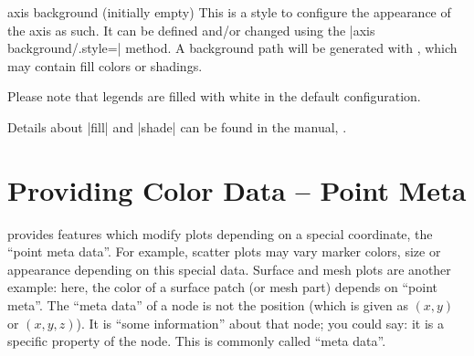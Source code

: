 \begin{pgfplotskey}{axis background (initially empty)}
    This is a style to configure the appearance of the axis as such. It can be
    defined and/or changed using the |axis background/.style=|
    method. A background path will be generated with , which may
    contain fill colors or shadings.
\pgfplotsexpensiveexample
\begin{codeexample}[]
\end{codeexample}

    Please note that legends are filled with white in the default
    configuration.
\begin{codeexample}[]
\end{codeexample}
    Details about |fill| and |shade| can be found in the \Tikz{} manual,
    \cite{tikz}.
\end{pgfplotskey}


\section{Providing Color Data -- Point Meta}
\label{sec:pgfplots:point:meta}

\PGFPlots{} provides features which modify plots depending on a special
coordinate, the ``point meta data''. For example, scatter plots may vary marker
colors, size or appearance depending on this special data. Surface and mesh
plots are another example: here, the color of a surface patch (or mesh part)
depends on ``point meta''. The ``meta data'' of a node is not the position
(which is given as $(x,y)$ or $(x,y,z)$). It is ``some information'' about that
node; you could say: it is a specific property of the node. This is commonly
called ``meta data''.


